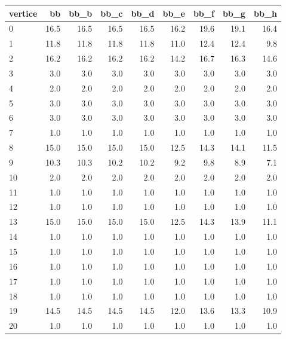 \begin{tabular}{lrrrrrrrr}
\toprule
vertice &    bb &  bb\_b &  bb\_c &  bb\_d &  bb\_e &  bb\_f &  bb\_g &  bb\_h \\
\midrule
      0 &  16.5 &  16.5 &  16.5 &  16.5 &  16.2 &  19.6 &  19.1 &  16.4 \\
      1 &  11.8 &  11.8 &  11.8 &  11.8 &  11.0 &  12.4 &  12.4 &   9.8 \\
      2 &  16.2 &  16.2 &  16.2 &  16.2 &  14.2 &  16.7 &  16.3 &  14.6 \\
      3 &   3.0 &   3.0 &   3.0 &   3.0 &   3.0 &   3.0 &   3.0 &   3.0 \\
      4 &   2.0 &   2.0 &   2.0 &   2.0 &   2.0 &   2.0 &   2.0 &   2.0 \\
      5 &   3.0 &   3.0 &   3.0 &   3.0 &   3.0 &   3.0 &   3.0 &   3.0 \\
      6 &   3.0 &   3.0 &   3.0 &   3.0 &   3.0 &   3.0 &   3.0 &   3.0 \\
      7 &   1.0 &   1.0 &   1.0 &   1.0 &   1.0 &   1.0 &   1.0 &   1.0 \\
      8 &  15.0 &  15.0 &  15.0 &  15.0 &  12.5 &  14.3 &  14.1 &  11.5 \\
      9 &  10.3 &  10.3 &  10.2 &  10.2 &   9.2 &   9.8 &   8.9 &   7.1 \\
     10 &   2.0 &   2.0 &   2.0 &   2.0 &   2.0 &   2.0 &   2.0 &   2.0 \\
     11 &   1.0 &   1.0 &   1.0 &   1.0 &   1.0 &   1.0 &   1.0 &   1.0 \\
     12 &   1.0 &   1.0 &   1.0 &   1.0 &   1.0 &   1.0 &   1.0 &   1.0 \\
     13 &  15.0 &  15.0 &  15.0 &  15.0 &  12.5 &  14.3 &  13.9 &  11.1 \\
     14 &   1.0 &   1.0 &   1.0 &   1.0 &   1.0 &   1.0 &   1.0 &   1.0 \\
     15 &   1.0 &   1.0 &   1.0 &   1.0 &   1.0 &   1.0 &   1.0 &   1.0 \\
     16 &   1.0 &   1.0 &   1.0 &   1.0 &   1.0 &   1.0 &   1.0 &   1.0 \\
     17 &   1.0 &   1.0 &   1.0 &   1.0 &   1.0 &   1.0 &   1.0 &   1.0 \\
     18 &   1.0 &   1.0 &   1.0 &   1.0 &   1.0 &   1.0 &   1.0 &   1.0 \\
     19 &  14.5 &  14.5 &  14.5 &  14.5 &  12.0 &  13.6 &  13.3 &  10.9 \\
     20 &   1.0 &   1.0 &   1.0 &   1.0 &   1.0 &   1.0 &   1.0 &   1.0 \\

\end{tabular}
